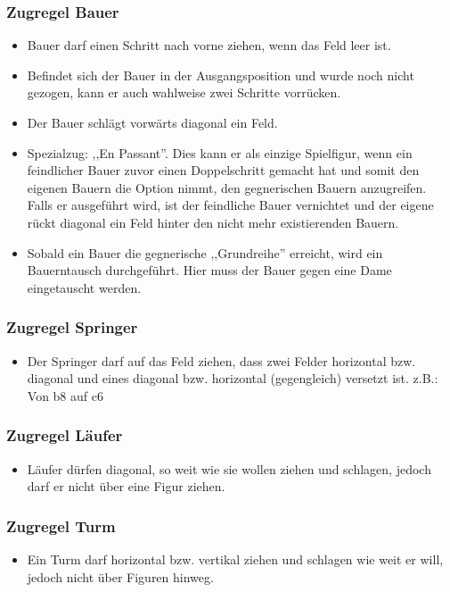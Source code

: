 \documentclass[12pt,a4paper]{article}
\begin{document}
{\subsubsection{Zugregel Bauer}
\label{SUBSUBSEC:PAWN}
\begin{itemize}
	\item{Bauer darf einen Schritt nach vorne ziehen, wenn das Feld leer ist.}
	\item{Befindet sich der Bauer in der Ausgangsposition und wurde noch nicht gezogen, kann er auch wahlweise zwei Schritte vorrücken.}
	\item{Der Bauer schlägt vorwärts diagonal ein Feld.}
	\item{Spezialzug: ,,En Passant''. Dies kann er als einzige Spielfigur, wenn ein feindlicher Bauer zuvor einen Doppelschritt gemacht hat und somit den eigenen Bauern die Option nimmt, den gegnerischen Bauern anzugreifen. Falls er ausgeführt wird, ist der feindliche Bauer vernichtet und der eigene rückt diagonal ein Feld hinter den nicht mehr existierenden Bauern.}
	\item{Sobald ein Bauer die gegnerische ,,Grundreihe'' erreicht, wird ein Bauerntausch durchgeführt. Hier muss der Bauer gegen eine Dame eingetauscht werden.}
\end{itemize}

\subsubsection{Zugregel Springer}
\label{SUBSUBSEC:JUMPER}
\begin{itemize}
	\item{Der Springer darf auf das Feld ziehen, dass zwei Felder horizontal bzw. diagonal und eines diagonal bzw. horizontal (gegengleich) versetzt ist. z.B.: Von  b8 auf c6}
\end{itemize}
\subsubsection{Zugregel Läufer}
\label{SUBSUBSEC:BISHOP}
\begin{itemize}
	\item{Läufer dürfen diagonal, so weit wie sie wollen ziehen und schlagen, jedoch darf er nicht über eine Figur ziehen.}
\end{itemize}

\subsubsection{Zugregel Turm}
\label{SUBSUBSEC:ROOK}
\begin{itemize}
	\item{Ein Turm darf horizontal bzw. vertikal ziehen und schlagen wie weit er will, jedoch nicht über Figuren hinweg.}
\end{itemize}

}
\end{document}
